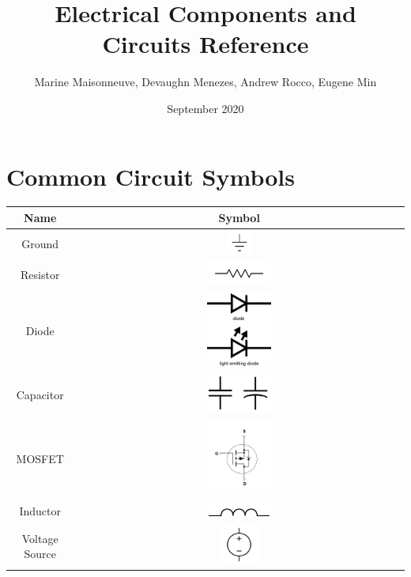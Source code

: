 \documentclass{article}
\title{Electrical Components and Circuits Reference}
\author{Marine Maisonneuve, Devaughn Menezes, Andrew Rocco, Eugene Min }
\date{September 2020}
\begin{document}
\maketitle

\tableofcontents

\section{Common Circuit Symbols}

\begin{tabular}{c|c}
    Name & Symbol \\
    \hline
    Ground & \includegraphics[width=0.08\textwidth]{img/Symbol G7_Earth.JPG}\\
    \hline
    Resistor & 
    \includegraphics[width=0.2\textwidth]{img/1280px-Resistor_symbol_America.svg.png}\\
    \hline
    Diode & \includegraphics[width=0.2\textwidth]{img/51f1c87ace395fea20000004.png}\\
    \hline
    Capacitor & \includegraphics[width=0.2\textwidth]{img/Screenshot_20200913_143337.png} \\
    \hline
    MOSFET & \includegraphics[width=0.2\textwidth]{img/62fe4e5439abf066e1badb3f8a73b483b52614ec.jpeg} \\
    \hline
    Inductor & \includegraphics[width=0.2\textwidth]{img/1280px-Inductor_symbol.svg.png}\\
    \hline
    Voltage Source & \includegraphics[width=0.12\textwidth]{img/1200px-Voltage_Source.svg.png}
\end{tabular}
\end{document}
